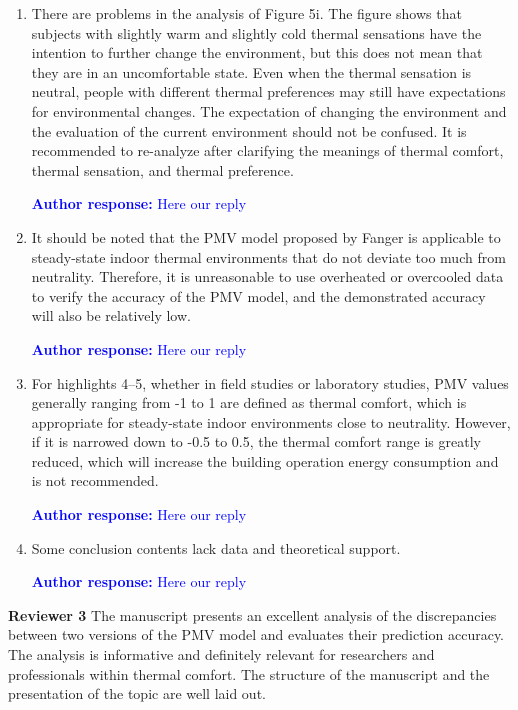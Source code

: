 \documentclass[a4paper, 10pt]{letter}
\newcommand{\response}[1]{\textcolor{blue}{\textbf{Author response:} #1}}
\begin{document}
\begin{letter}
\begin{enumerate}
            \response{Here our reply}

            \item There are problems in the analysis of Figure 5i.
            The figure shows that subjects with slightly warm and slightly cold thermal sensations have the intention to further change the environment, but this does not mean that they are in an uncomfortable state.
            Even when the thermal sensation is neutral, people with different thermal preferences may still have expectations for environmental changes.
            The expectation of changing the environment and the evaluation of the current environment should not be confused.
            It is recommended to re-analyze after clarifying the meanings of thermal comfort, thermal sensation, and thermal preference.

            \response{Here our reply}

            \item It should be noted that the PMV model proposed by Fanger is applicable to steady-state indoor thermal environments that do not deviate too much from neutrality.
            Therefore, it is unreasonable to use overheated or overcooled data to verify the accuracy of the PMV model, and the demonstrated accuracy will also be relatively low.

            \response{Here our reply}

            \item For highlights 4--5, whether in field studies or laboratory studies, PMV values generally ranging from -1 to 1 are defined as thermal comfort, which is appropriate for steady-state indoor environments close to neutrality.
            However, if it is narrowed down to -0.5 to 0.5, the thermal comfort range is greatly reduced, which will increase the building operation energy consumption and is not recommended.

            \response{Here our reply}

            \item Some conclusion contents lack data and theoretical support.

            \response{Here our reply}

        \end{enumerate}

        \clearpage

        \textbf{Reviewer 3}
        The manuscript presents an excellent analysis of the discrepancies between two versions of the PMV model and evaluates their prediction accuracy.
        The analysis is informative and definitely relevant for researchers and professionals within thermal comfort.
        The structure of the manuscript and the presentation of the topic are well laid out.


\end{letter}
\end{document}
